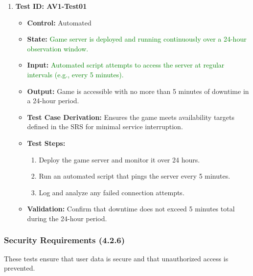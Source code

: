 \documentclass[12pt]{article}
\newcommand{\added}[1]{\textcolor{green}{#1}}
\begin{document}
\begin{enumerate}
    \item \textbf{Test ID: AV1-Test01}
    \begin{itemize}
        \item \textbf{Control:} Automated
        \item \textbf{State:} \added{Game server is deployed and running continuously over a 24-hour observation window.}
        \item \textbf{Input:} \added{Automated script attempts to access the server at regular intervals (e.g., every 5 minutes).}
        \item \textbf{Output:} Game is accessible with no more than 5 minutes of downtime in a 24-hour period.
        \item \textbf{Test Case Derivation:} Ensures the game meets availability targets defined in the SRS for minimal service interruption.
        \item \textbf{Test Steps:}
        \begin{enumerate}
            \item Deploy the game server and monitor it over 24 hours.
            \item Run an automated script that pings the server every 5 minutes.
            \item Log and analyze any failed connection attempts.
        \end{enumerate}
        \item \textbf{Validation:} Confirm that downtime does not exceed 5 minutes total during the 24-hour period.
    \end{itemize}
\end{enumerate}

\subsubsection{Security Requirements (4.2.6)}

These tests ensure that user data is secure and that unauthorized access is prevented.
\end{document}
